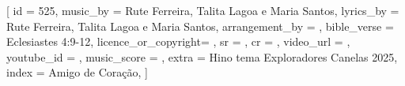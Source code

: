 [
    id                  = {525},
    music_by            = {Rute Ferreira, Talita Lagoa e Maria Santos}, %
    lyrics_by           = {Rute Ferreira, Talita Lagoa e Maria Santos}, %
    arrangement_by      = {}, %
    bible_verse         = {Eclesiastes 4:9-12},
    licence_or_copyright= {},
    sr                  = {},
    cr                  = {},
    video_url           = {}, %
    youtube_id          = {}, %
    music_score         = {}, %
    extra               = {Hino tema Exploradores Canelas 2025},
    index               = {Amigo de Coração},
]

